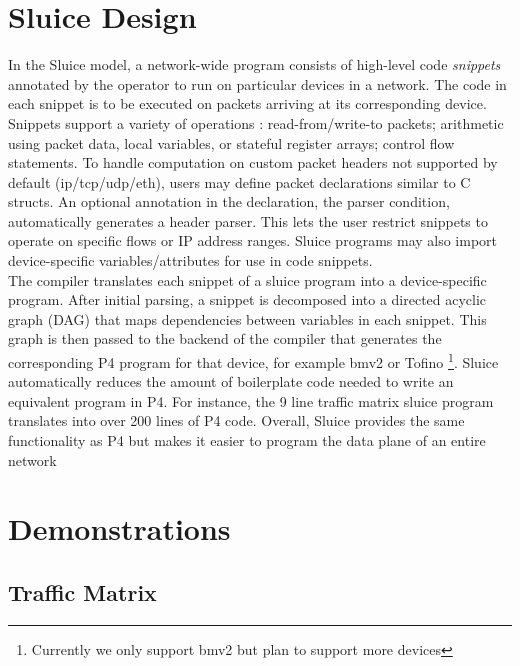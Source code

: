 \section{Sluice Design}
In the Sluice model, a network-wide program consists of high-level code \textit{snippets} annotated by the operator to run on particular devices in a network. The code in each snippet is to be executed on packets arriving at its corresponding device. Snippets support a variety of operations : read-from/write-to packets; arithmetic using packet data, local variables, or stateful register arrays; control flow statements. To handle computation on custom packet headers not supported by default (ip/tcp/udp/eth), users may define packet declarations similar to C structs. An optional annotation in the declaration, the parser condition, automatically generates a header parser. This lets the user restrict snippets to operate on specific flows or IP address ranges. Sluice programs may also import device-specific variables/attributes for use in code snippets. \\
\indent The compiler translates each snippet of a sluice program into a device-specific program. After initial parsing, a snippet is decomposed into a directed acyclic graph (DAG) that maps dependencies between variables in each snippet. This graph is then passed to the backend of the compiler that generates the corresponding P4 program for that device, for example bmv2 or Tofino \footnote{Currently we only support bmv2 but plan to support more devices}. Sluice automatically reduces the amount of boilerplate code needed to write an equivalent program in P4. For instance, the 9 line traffic matrix sluice program translates into over 200 lines of P4 code. Overall, Sluice provides the same functionality as P4 but makes it easier to program the data plane of an entire network


 


\section{Demonstrations}
 
\subsection{Traffic Matrix}

